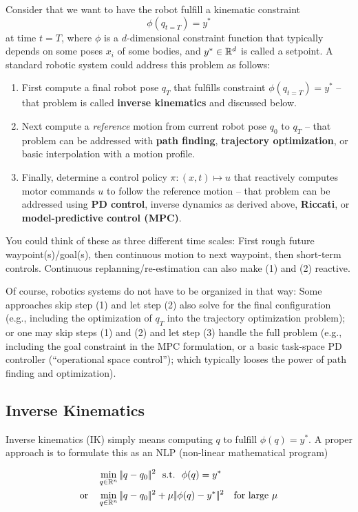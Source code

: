 Consider that we want to have the robot fulfill a kinematic constraint
$$\phi(q_{t=T}) = y^*$$ at time $t=T$, where $\phi$ is a $d$-dimensional
constraint function that typically depends on some poses $x_i$ of some bodies,
and $y^*\in{\mathbb{R}}^d$ is called a setpoint. A standard robotic system
could address this problem as follows:
\begin{enumerate}
  \item First compute a final robot pose $q_T$ that fulfills constraint 
    $\phi(q_{t=T}) = y^*$ -- that problem is called \textbf{inverse
    kinematics} and discussed below.
  \item Next compute a \emph{reference} motion from current robot pose
    $q_0$ to $q_T$ -- that problem can be addressed with \textbf{path
    finding}, \textbf{trajectory optimization}, or basic interpolation
    with a motion profile.
  \item Finally, determine a control policy $\pi: (x,t) \mapsto u$
    that reactively computes motor commands $u$ to follow the
    reference motion -- that problem can be addressed using \textbf{PD
    control}, inverse dynamics as derived above, \textbf{Riccati},
    or \textbf{model-predictive control (MPC)}.
\end{enumerate}
You could think of these as three different time scales: First rough
future waypoint(s)/goal(s), then continuous motion to next waypoint,
then short-term controls. Continuous replanning/re-estimation can also make (1) and (2) reactive.

Of course, robotics systems do not have to be organized in that
way: Some approaches skip step (1) and let step (2) also solve for the
final configuration (e.g., including the optimization of $q_T$ into
the trajectory optimization problem); or one may skip steps (1) and
(2) and let step (3) handle the full problem (e.g., including the goal
constraint in the MPC formulation, or a basic task-space PD controller
(``operational space control''); which typically looses the power of
path finding and optimization).


\subsection{Inverse Kinematics}

Inverse kinematics (IK) simply means computing $q$ to fulfill $\phi(q) =
y^*$. A proper approach is to formulate this as an NLP (non-linear
mathematical program)

\begin{align}
&\min_{q\in{\mathbb{R}}^n} |\!|q-q_0|\!|^2 ~~\text{s.t.}~~ \phi(q) = y^* \label{eqIK}\\
\text{or}\quad&\min_{q\in{\mathbb{R}}^n} |\!|q-q_0|\!|^2 + \mu |\!|\phi(q) -
y^*|\!|^2 \quad\text{for large $\mu$} 
\end{align}

